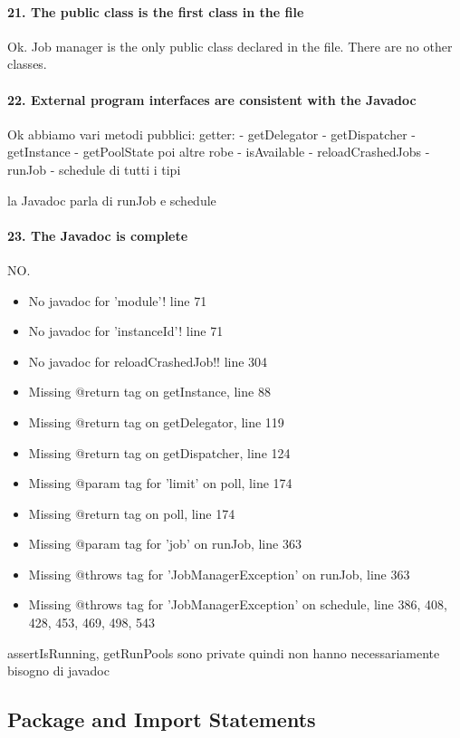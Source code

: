 \documentclass[english]{article}
\begin{document}
\paragraph{21. The public class is the first class in the file}
Ok.
Job manager is the only public class declared in the file.
There are no other classes.

\paragraph{22. External program interfaces are consistent with the Javadoc}
Ok
abbiamo vari metodi pubblici:
getter:
- getDelegator
- getDispatcher
- getInstance
- getPoolState
poi altre robe
- isAvailable
- reloadCrashedJobs
- runJob
- schedule di tutti i tipi

la Javadoc parla di runJob e schedule

\paragraph{23. The Javadoc is complete}
NO.
\begin{itemize}
	\item No javadoc for 'module'! line 71
	\item No javadoc for 'instanceId'! line 71
	\item No javadoc for reloadCrashedJob!! line 304
	\item Missing @return tag on getInstance, line 88
	\item Missing @return tag on getDelegator, line 119
	\item Missing @return tag on getDispatcher, line 124
	\item Missing @param tag for 'limit' on poll, line 174
	\item Missing @return tag on poll, line 174
	\item Missing @param tag for 'job' on runJob, line 363
	\item Missing @throws tag for 'JobManagerException' on runJob, line 363
	\item Missing @throws tag for 'JobManagerException' on schedule, line 386, 408, 428, 453, 469, 498, 543
\end{itemize}

assertIsRunning, getRunPools sono private quindi non hanno necessariamente bisogno di javadoc

\subsection{Package and Import Statements}
\end{document}
